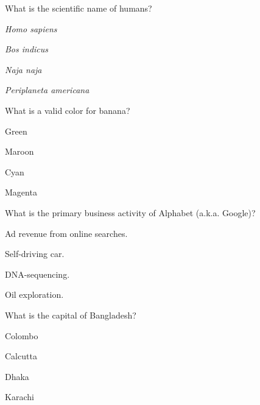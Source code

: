 \documentclass[12pt]{exam}
\begin{document}
\begin{questions}
\begin{oneparchoices}
        
        
        \end{oneparchoices}

    \question What is the scientific name of humans?
    
        \begin{oneparchoices}
        
            \choice \textit{Homo sapiens}
        
            \choice \textit{Bos indicus}
        
            \choice \textit{Naja naja}
        
            \choice \textit{Periplaneta americana}
        
        \end{oneparchoices}

    \question What is a valid color for banana?
    
        \begin{oneparchoices}
        
            \choice Green
        
            \choice Maroon
        
            \choice Cyan
        
            \choice Magenta
        
        \end{oneparchoices}

    \question What is the primary business activity of Alphabet (a.k.a. Google)?
    
        \begin{oneparchoices}
        
            \choice Ad revenue from online searches.
        
            \choice Self-driving car.
        
            \choice DNA-sequencing.
        
            \choice Oil exploration.
        
        \end{oneparchoices}

    \question What is the capital of Bangladesh?
    
        \begin{oneparchoices}
        
            \choice Colombo
        
            \choice Calcutta
        
            \choice Dhaka
        
            \choice Karachi
        
        \end{oneparchoices}

\end{questions}
\pagebreak
\end{document}
